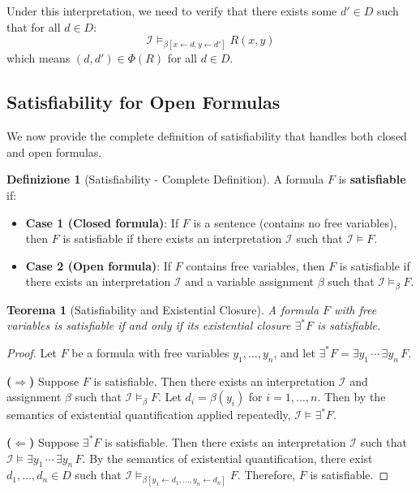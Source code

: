 \documentclass[11pt,a4paper]{article}
\theoremstyle{definition}
\newtheorem{definition}{Definizione}[section]
\theoremstyle{plain}
\newtheorem{theorem}{Teorema}[section]
\theoremstyle{remark}
\begin{document}
Under this interpretation, we need to verify that there exists some $d' \in D$ such that for all $d \in D$:
\[
\mathcal{I} \models_{\beta[x \leftarrow d, y \leftarrow d']} R(x, y)
\]
which means $(d, d') \in \Phi(R)$ for all $d \in D$.

\subsection{Satisfiability for Open Formulas}

We now provide the complete definition of satisfiability that handles both closed and open formulas.

\begin{definition}[Satisfiability - Complete Definition]
A formula $F$ is \textbf{satisfiable} if:
\begin{itemize}
    \item \textbf{Case 1 (Closed formula)}: If $F$ is a sentence (contains no free variables), then $F$ is satisfiable if there exists an interpretation $\mathcal{I}$ such that $\mathcal{I} \models F$.
    
    \item \textbf{Case 2 (Open formula)}: If $F$ contains free variables, then $F$ is satisfiable if there exists an interpretation $\mathcal{I}$ and a variable assignment $\beta$ such that $\mathcal{I} \models_\beta F$.
\end{itemize}
\end{definition}

\begin{theorem}[Satisfiability and Existential Closure]
A formula $F$ with free variables is satisfiable if and only if its existential closure $\exists^* F$ is satisfiable.
\end{theorem}

\begin{proof}
Let $F$ be a formula with free variables $y_1, \dots, y_n$, and let $\exists^* F = \exists y_1 \, \cdots \, \exists y_n \, F$.

\textbf{($\Rightarrow$)} Suppose $F$ is satisfiable. Then there exists an interpretation $\mathcal{I}$ and assignment $\beta$ such that $\mathcal{I} \models_\beta F$. Let $d_i = \beta(y_i)$ for $i = 1, \dots, n$. Then by the semantics of existential quantification applied repeatedly, $\mathcal{I} \models \exists^* F$.

\textbf{($\Leftarrow$)} Suppose $\exists^* F$ is satisfiable. Then there exists an interpretation $\mathcal{I}$ such that $\mathcal{I} \models \exists y_1 \, \cdots \, \exists y_n \, F$. By the semantics of existential quantification, there exist $d_1, \dots, d_n \in D$ such that $\mathcal{I} \models_{\beta[y_1 \leftarrow d_1, \dots, y_n \leftarrow d_n]} F$. Therefore, $F$ is satisfiable.
\end{proof}
\end{document}
